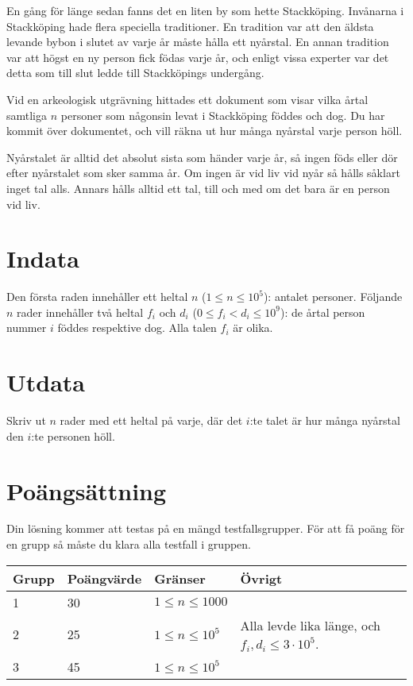En gång för länge sedan fanns det en liten by som hette Stackköping.
Invånarna i Stackköping hade flera speciella traditioner.
En tradition var att den äldsta levande bybon i slutet av varje år måste hålla ett nyårstal.
En annan tradition var att högst en ny person fick födas varje år, och enligt vissa experter var det detta som till slut ledde till Stackköpings undergång.

Vid en arkeologisk utgrävning hittades ett dokument som visar vilka årtal samtliga $n$ personer som någonsin levat i Stackköping föddes och dog.
Du har kommit över dokumentet, och vill räkna ut hur många nyårstal varje person höll.

Nyårstalet är alltid det absolut sista som händer varje år, så ingen föds eller dör efter nyårstalet som sker samma år.
Om ingen är vid liv vid nyår så hålls såklart inget tal alls.
Annars hålls alltid ett tal, till och med om det bara är en person vid liv.

\section*{Indata}

Den första raden innehåller ett heltal $n$ ($1 \le n \le 10^5$): antalet personer.
Följande $n$ rader innehåller två heltal $f_i$ och $d_i$ ($0 \le f_i < d_i \le 10^9$): de årtal person nummer $i$ föddes respektive dog.
Alla talen $f_i$ är olika.

\section*{Utdata}

Skriv ut $n$ rader med ett heltal på varje, där det $i$:te talet är hur många nyårstal den $i$:te personen höll.

\section*{Poängsättning}
Din lösning kommer att testas på en mängd testfallsgrupper. För att få poäng för en grupp så måste du klara alla testfall i gruppen.

\begin{tabular}{| l | l | l | l |}
\hline
Grupp & Poängvärde & Gränser & Övrigt \\ \hline
1     & 30         &  $1 \le n \le 1000$ & \\ \hline
2     & 25         &  $1 \le n \le 10^5$ & Alla levde lika länge, och $f_i, d_i \le 3\cdot 10^5$. \\ \hline
3     & 45         &  $1 \le n \le 10^5$ & \\ \hline
\end{tabular}

